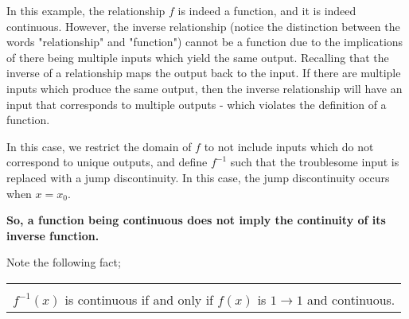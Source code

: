 \documentclass{article}
\begin{document}
\begin{center}
\end{center}

In this example, the relationship $f$ is indeed a function, and it is indeed continuous. However, the inverse relationship (notice the distinction between the words "relationship" and "function") cannot be a function due to the implications of there being multiple inputs which yield the same output. Recalling that the inverse of a relationship maps the output back to the input. If there are multiple inputs which produce the same output, then the inverse relationship will have an input that corresponds to multiple outputs - which violates the definition of a function.

\vspace{10pt}

In this case, we restrict the domain of $f$ to not include inputs which do not correspond to unique outputs, and define $f^{-1}$ such that the troublesome input is replaced with a jump discontinuity. In this case, the jump discontinuity occurs when $x=x_0$.

\vspace{10pt}

{\bf{}So, a function being continuous does not imply the continuity of its inverse function.}

\vspace{10pt}

Note the following fact;

\begin{center}
\begin{tabular}{|c|}
\hline\\
$f^{-1}(x)$ is continuous if and only if $f(x)$ is $1\to1$ and continuous.\\[1em]
\hline
\end{tabular}
\end{center}
\end{document}
